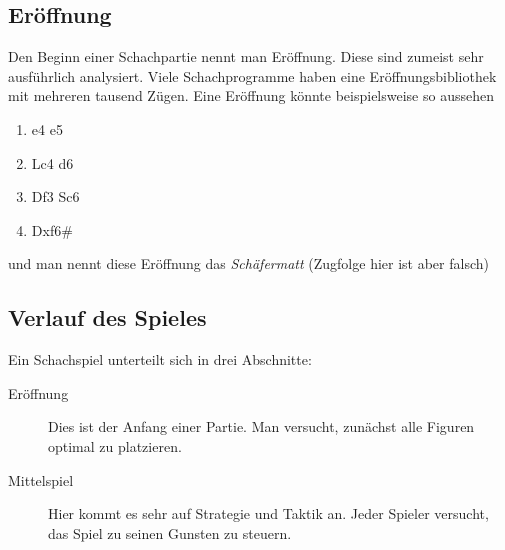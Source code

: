 \begin{refsection}
\subsection{Eröffnung}
Den Beginn einer Schachpartie nennt man Eröffnung. 
Diese sind zumeist sehr ausführlich analysiert. 
Viele Schachprogramme haben eine Eröffnungsbibliothek mit mehreren tausend Zügen. 
Eine Eröffnung könnte beispielsweise so aussehen
%
\begin{enumerate}[--, nosep]
  \item e4 e5
  \item Lc4 d6
  \item Df3 Sc6
  \item Dxf6\#
\end{enumerate}

und man nennt diese Eröffnung das \emph{Schäfermatt} (Zugfolge hier ist aber falsch)

%


\subsection{Verlauf des Spieles}
%
Ein Schachspiel unterteilt sich in drei Abschnitte:
%
\begin{description}
  \item[Eröffnung] 
  Dies ist der Anfang einer Partie. 
  Man versucht, zunächst alle Figuren optimal zu platzieren.
  
  \item[Mittelspiel] 
  Hier kommt es sehr auf Strategie und Taktik an. 
  Jeder Spieler versucht, das Spiel zu seinen Gunsten zu steuern.
  

\end{description}
\end{refsection}

